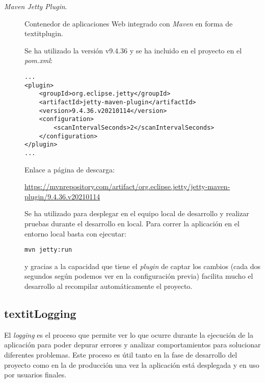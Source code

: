 \begin{description}
	\item[\textit{Maven Jetty Plugin}.] Contenedor de aplicaciones Web integrado con \textit{Maven} en forma de textit{plugin}.
	
		Se ha utilizado la versión  v9.4.36 y se ha incluido en el proyecto en el \textit{pom.xml}:
	
\begin{verbatim}
...
<plugin>
	<groupId>org.eclipse.jetty</groupId>
	<artifactId>jetty-maven-plugin</artifactId>
	<version>9.4.36.v20210114</version>
	<configuration>
		<scanIntervalSeconds>2</scanIntervalSeconds>
	</configuration>
</plugin>
...
\end{verbatim}
		
Enlace a página de descarga:
		
		\url{https://mvnrepository.com/artifact/org.eclipse.jetty/jetty-maven-plugin/9.4.36.v20210114}
		
Se ha utilizado para desplegar en el equipo local de desarrollo y realizar pruebas durante el desarrollo en local. Para correr la aplicación en el entorno local basta con ejecutar: 
		
\begin{verbatim}
mvn jetty:run
\end{verbatim}

y gracias a la capacidad que tiene el \textit{plugin} de captar los cambios (cada dos segundos según podemos ver en la configuración previa) facilita mucho el desarrollo al recompilar automáticamente el proyecto.
		
\end{description}
\subsection{textit{Logging}}
El \textit{logging} es el proceso que permite ver lo que ocurre durante la ejecución de la aplicación para poder depurar errores y analizar comportamientos para solucionar diferentes problemas. Este proceso es útil tanto en la fase de desarrollo del proyecto como en la de producción una vez la aplicación está desplegada y en uso por usuarios finales.

